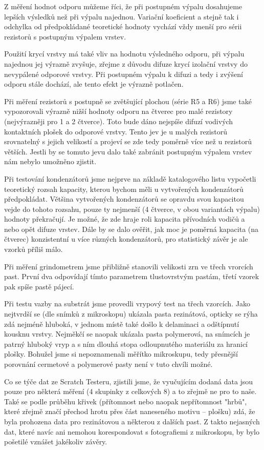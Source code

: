 Z měření hodnot odporu můžeme říci, že při postupném výpalu dosahujeme lepších výsledků než při výpalu najednou. Variační koeficient a stejně tak i odchylka od předpokládané teoretické hodnoty vychází vždy menší pro sérii rezistorů s postupným výpalem vrstev. 

Použití krycí vrstvy má také vliv na hodnotu výsledného odporu, při výpalu najednou jej výrazně zvyšuje, zřejme z důvodu difuze krycí izolační vrstvy do nevypálené odporové vrstvy. Při postupném výpalu k difuzi a tedy i zvýšení odporu stále dochází, ale tento efekt je výrazně potlačen.

Při měření rezistorů s postupně se zvětšující plochou (série R5 a R6) jsme také vypozorovali výrazně nižší hodnoty odporu na čtverec pro malé rezistory (nejvýrazněji pro 1 a 2 čtverce). Toto bude dáno nejspíše difuzí vodivých kontaktních plošek do odporové vrstvy. Tento jev je u malých rezistorů srovnatelný s jejich velikostí a projeví se zde tedy poměrně více než u rezistorů větších. Jestli by se tomuto jevu dalo také zabránit postupným výpalem vrstev nám nebylo umožněno zjistit. 


Při testování kondenzátorů jsme nejprve na základě katalogového listu vypočetli teoretický rozsah kapacity, kterou bychom měli u vytvořených kondenzátorů předpokládat. Většina vytvořených kondenzátorů se opravdu svou kapacitou vejde do tohoto rozsahu, pouze ty nejmenší (4 čtverce, v obou variantách výpalu) hodnoty překračují. Je možné, že zde hraje roli kapacita přívodních vodičů a nebo opět difuze vrstev. Dále by se dalo ověřit, jak moc je poměrná kapacita (na čtverec) konzistentní u více různých kondenzátorů, pro statistický závěr je ale vzorků příliš málo. 


Při měření grindometrem jsme přibližně stanovili velikosti zrn ve třech vrorcích past. První dva odpovídají tímto parametrem tlustovrstvým pastám, třetí vzorek pak spíše pastě pájecí.


Při testu vazby na substrát jsme provedli vrypový test na třech vzorcích. Jako nejtvrdší se (dle snímků z mikroskopu) ukázala pasta rezinátová, opticky se rýha zdá nejméně hluboká, v jednom místě také došlo k delaminaci a odštípnutí kousknu vrstvy. Nejměkčí se naopak ukázala pasta polymerová, na snímcích je patrný hluboký vryp a s ním dlouhá stopa odloupnutého materiálu za hranicí plošky. Bohužel jsme si nepoznamenali měřítko mikroskupu, tedy přesnější porovnání cermetové a polymerové pasty není v tuto chvíli možné. 

Co se týče dat ze Scratch Testeru, zjistili jsme, že vyučujícím dodaná data jsou pouze pro některá měření (4 skupinky z celkových 8) a to zřejmě ne pro to naše. Také se podle průběhu křivek (přítomnost nebo naopak nepřítomnost "hrbů", které zřejmě značí přechod hrotu přes část naneseného motivu -- plošku) zdá, že byla prohozena data pro rezinátovou a některou z dalších past. Z takto nejasných dat, které navíc ani nemohou korespondovat s fotografiemi z mikroskopu, by bylo pošetilé vznášet jakékoliv závěry.